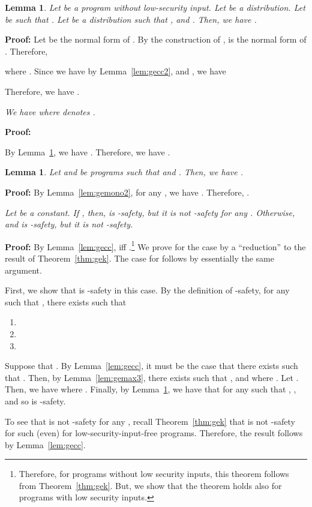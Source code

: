 \documentclass{llncs}
\newtheorem{lemma}[theorem]{Lemma}
\newenvironment{proof}{\noindent\rm{\bf Proof:}}{\hbox{}\vspace*{0.2\baselineskip}}
\newenvironment{reflemma}[1]{\begin{trivlist}\item[\hskip
      \labelsep{\bf Lemma #1.}]\it}{\end{trivlist}}
\newenvironment{reftheorem}[1]{\begin{trivlist}\item[\hskip
      \labelsep{\bf Theorem #1.}]\it}{\end{trivlist}}
\begin{document}
\begin{lemma}
\label{lem:gecc3}
Let  be a program without low-security input.  Let  be a
distribution.  Let  be such that
.
Let  be a distribution such that
, and
.  Then, we have .
\end{lemma}
\begin{proof}
Let  be the normal form of .  By the construction of ,  is the
normal form of .  Therefore,

where .  Since we have  by Lemma~\ref{lem:gecc2}, and
, we have

Therefore, we have .
\end{proof}

\begin{reflemma}{\ref{lem:gecc}}
We have  where  denotes .
\end{reflemma}
\begin{proof}

By Lemma~\ref{lem:gecc3}, we have .  Therefore, we have
.
\end{proof}


\begin{lemma}
\label{lem:geccmono}
  Let  and  be programs such that
   and
  .  Then, we have .
\end{lemma}
\begin{proof}
By Lemma~\ref{lem:gemono2}, for any , we have .  Therefore,
.
\end{proof}

\begin{reftheorem}{\ref{thm:gecck}}
  Let  be a constant.  If , then, 
  is -safety, but it is not -safety for any .  Otherwise,  and  is
  -safety, but it is not -safety.
\end{reftheorem}
\begin{proof}
By Lemma~\ref{lem:gecc},  iff .\footnote{Therefore, for
  programs without low security inputs, this theorem follows from
  Theorem~\ref{thm:gek}.  But, we show that the theorem holds also for
  programs with low security inputs.}  We prove for the case  by a ``reduction'' to the result of Theorem~\ref{thm:gek}.
The case for  follows by essentially the same
argument.

First, we show that  is -safety in this case.  By
the definition of -safety, for any  such that , there exists  such that
\begin{enumerate}
\item 
\item 
\item 
\end{enumerate}
Suppose that .  By Lemma~\ref{lem:gecc}, it
must be the case that there exists  such that .  Then, by
Lemma~\ref{lem:gemax3}, there exists 
such that , and  where
.  Let .
Then, we have  where .  Finally,
by Lemma~\ref{lem:geccmono}, we have that for any  such that
, , and so  is -safety.

To see that  is not -safety for any , recall Theorem~\ref{thm:gek} that  is not
-safety for such  (even) for low-security-input-free programs.
Therefore, the result follows by Lemma~\ref{lem:gecc}.
\end{proof}
\end{document}
